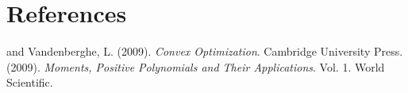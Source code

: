 \documentclass[11pt]{article}
\begin{document}
\clearpage
\section*{References}
\beginrefs
{} and {\sc Vandenberghe, L.} (2009).
{\it Convex Optimization}.
Cambridge University Press.
 (2009).
{\it Moments, Positive Polynomials and Their Applications}. Vol. 1. 
World Scientific.
\endrefs



\end{document}
